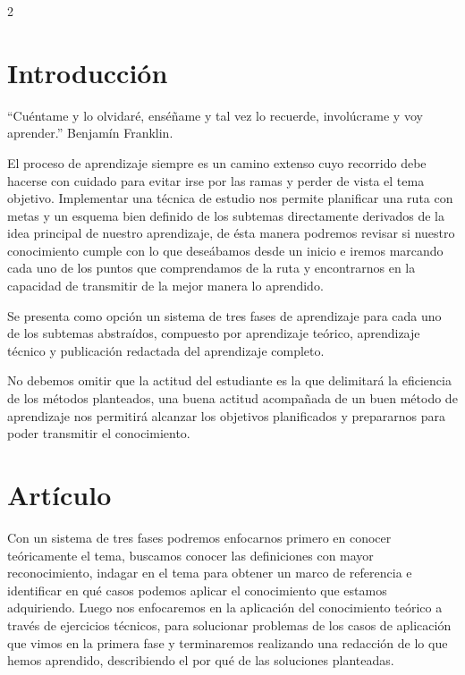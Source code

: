 \documentclass[12pt,spanish,Letterpaper,openany]{book}
\begin{document}
\begin {multicols}{2}

\hypertarget{introducciuxf3n-3}{%
\section{Introducción}\label{introducciuxf3n-3}}

``Cuéntame y lo olvidaré, enséñame y tal vez lo recuerde, involúcrame y voy aprender.'' Benjamín Franklin.

El proceso de aprendizaje siempre es un camino extenso cuyo recorrido debe hacerse con cuidado para evitar irse por las ramas y perder de vista el tema objetivo. Implementar una técnica de estudio nos permite planificar una ruta con metas y un esquema bien definido de los subtemas directamente derivados de la idea principal de nuestro aprendizaje, de ésta manera podremos revisar si nuestro conocimiento cumple con lo que deseábamos desde un inicio e iremos marcando cada uno de los puntos que comprendamos de la ruta y encontrarnos en la capacidad de transmitir de la mejor manera lo aprendido.

Se presenta como opción un sistema de tres fases de aprendizaje para cada uno de los subtemas abstraídos, compuesto por aprendizaje teórico, aprendizaje técnico y publicación redactada del aprendizaje completo.

No debemos omitir que la actitud del estudiante es la que delimitará la eficiencia de los métodos planteados, una buena actitud acompañada de un buen método de aprendizaje nos permitirá alcanzar los objetivos planificados y prepararnos para poder transmitir el conocimiento.

\hypertarget{artuxedculo-1}{%
\section{Artículo}\label{artuxedculo-1}}

Con un sistema de tres fases podremos enfocarnos primero en conocer teóricamente el tema, buscamos conocer las definiciones con mayor reconocimiento, indagar en el tema para obtener un marco de referencia e identificar en qué casos podemos aplicar el conocimiento que estamos adquiriendo. Luego nos enfocaremos en la aplicación del conocimiento teórico a través de ejercicios técnicos, para solucionar problemas de los casos de aplicación que vimos en la primera fase y terminaremos realizando una redacción de lo que hemos aprendido, describiendo el por qué de las soluciones planteadas.


\end{multicols}
\end{document}
